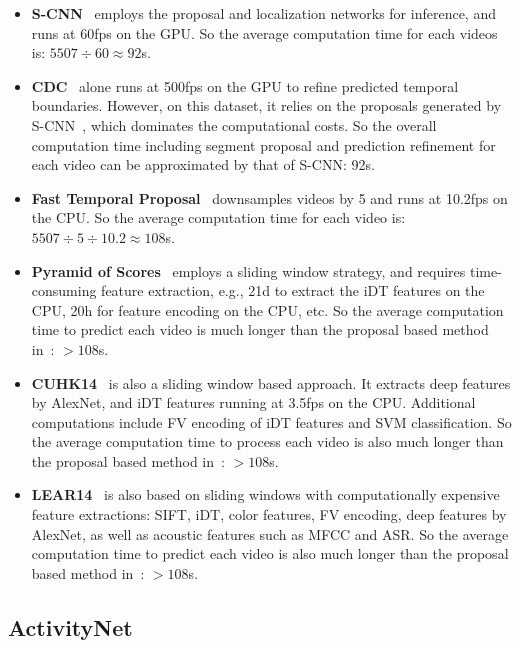 \documentclass{bmvc2k}
\begin{document}
\begin{itemize}
\item \textbf{S-CNN}~\cite{shou2016temporal} employs the proposal and localization networks for inference, and runs at 60fps on the GPU. So the average computation time for each videos is: $5507 \div 60 \approx 92$s.  

\item \textbf{CDC}~\cite{DBLP:journals/corr/ShouCZMC17} alone runs at 500fps on the GPU to refine predicted temporal boundaries. However, on this dataset, it relies on the proposals generated by S-CNN~\cite{shou2016temporal}, which dominates the computational costs. So the overall computation time including segment proposal and prediction refinement for each video can be approximated by that of S-CNN: 92s.       

\item \textbf{Fast Temporal Proposal}~\cite{fast-proposal} downsamples videos by 5 and runs at 10.2fps on the CPU. So the average computation time for each video is: $5507 \div 5  \div 10.2 \approx 108$s. 

\item \textbf{Pyramid of Scores}~\cite{score-pyramid} employs a sliding window strategy, and requires time-consuming feature extraction, e.g., 21d to extract the iDT features on the CPU, 20h for feature encoding on the CPU, etc. So the average computation time to predict each video is much longer than the proposal based method in~\cite{fast-proposal}: $> 108$s.     

\item \textbf{CUHK14}~\cite{wang2014action} is also a sliding window based approach. It extracts deep features by AlexNet, and iDT features running at 3.5fps on the CPU. Additional computations include FV encoding of iDT features and SVM classification. So the average computation time to process each video is also much longer than the proposal based method in~\cite{fast-proposal}: $> 108$s.   

\item \textbf{LEAR14}~\cite{oneata2014lear} is also based on  sliding windows with computationally expensive feature extractions: SIFT, iDT, color features, FV encoding, deep features by AlexNet, as well as acoustic features such as MFCC and ASR. So the average computation time to predict each video is also much longer than the proposal based method in~\cite{fast-proposal}: $> 108$s.  

\end{itemize}

\subsection{ActivityNet}
\end{document}
